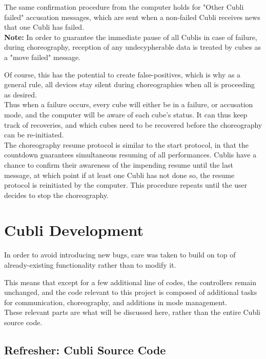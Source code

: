 \begin{itemize}
The same confirmation procedure from the computer holds for "Other Cubli failed" accusation messages, which are sent when a non-failed Cubli receives news that one Cubli has failed.\\

\textbf{Note:} In order to guarantee the immediate pause of all Cublis in case of failure, during choreography, reception of any undecypherable data is treated by cubes as a "move failed" message.

Of course, this has the potential to create false-positives, which is why as a general rule, all devices stay silent during choreographies when all is proceeding as desired.\\

Thus when a failure occurs, every cube will either be in a failure, or accusation mode, and the computer will be aware of each cube's status. It can thus keep track of recoveries, and which cubes need to be recovered before the choreography can be re-initiated.\\

The choreography resume protocol is similar to the start protocol, in that the countdown guarantees simultaneous resuming of all performances. Cublis have a chance to confirm their awareness of the impending resume until the last message, at which point if at least one Cubli has not done so, the resume protocol is reinitiated by the computer. This procedure repeats until the user decides to stop the choreography.




\end{itemize}

\section{Cubli Development}

In order to avoid introducing new bugs, care was taken to build on top of already-existing functionality rather than to modify it.

This means that except for a few additional line of codes, the controllers remain unchanged, and the code relevant to this project is composed of additional tasks for communication, choreography, and additions in mode management.\\

These relevant parts are what will be discussed here, rather than the entire Cubli source code.

\subsection{Refresher: Cubli Source Code }

